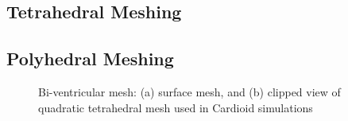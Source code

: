 \subsection{Tetrahedral Meshing}
\label{Tetrahedral Meshing}

\subsection{Polyhedral Meshing}
\label{Polyhedral Meshing}


\begin{figure}[ht]
\centering
{}
%
\caption{Bi-ventricular mesh: (a) surface mesh, and (b) clipped view of quadratic tetrahedral mesh used in Cardioid simulations}
\label{fig:tetmesh}
\end{figure}

